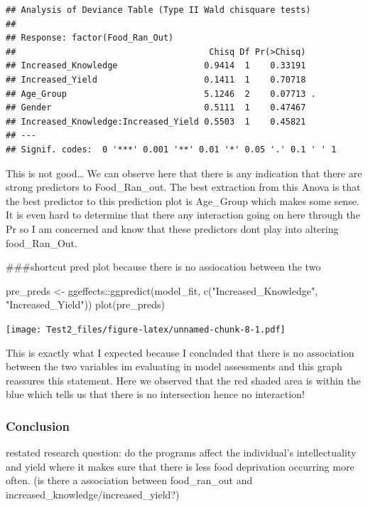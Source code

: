 \documentclass[
]{article}
\newenvironment{Shaded}{\begin{snugshade}}{\end{snugshade}}
\newcommand{\FunctionTok}[1]{\textcolor[rgb]{0.00,0.00,0.00}{#1}}
\newcommand{\NormalTok}[1]{#1}
\newcommand{\OtherTok}[1]{\textcolor[rgb]{0.56,0.35,0.01}{#1}}
\newcommand{\SpecialCharTok}[1]{\textcolor[rgb]{0.00,0.00,0.00}{#1}}
\newcommand{\StringTok}[1]{\textcolor[rgb]{0.31,0.60,0.02}{#1}}
\begin{document}
\begin{verbatim}
## Analysis of Deviance Table (Type II Wald chisquare tests)
## 
## Response: factor(Food_Ran_Out)
##                                      Chisq Df Pr(>Chisq)  
## Increased_Knowledge                 0.9414  1    0.33191  
## Increased_Yield                     0.1411  1    0.70718  
## Age_Group                           5.1246  2    0.07713 .
## Gender                              0.5111  1    0.47467  
## Increased_Knowledge:Increased_Yield 0.5503  1    0.45821  
## ---
## Signif. codes:  0 '***' 0.001 '**' 0.01 '*' 0.05 '.' 0.1 ' ' 1
\end{verbatim}

This is not good\ldots{} We can observe here that there is any
indication that there are strong predictors to Food\_Ran\_out. The best
extraction from this Anova is that the best predictor to this prediction
plot is Age\_Group which makes some sense. It is even hard to determine
that there any interaction going on here through the Pr so I am
concerned and know that these predictors dont play into altering
food\_Ran\_Out.

\#\#\#shortcut pred plot because there is no assiocation between the two

\begin{Shaded}
\begin{Highlighting}[]
\NormalTok{pre\_preds }\OtherTok{\textless{}{-}}\NormalTok{ ggeffects}\SpecialCharTok{::}\FunctionTok{ggpredict}\NormalTok{(model\_fit, }\FunctionTok{c}\NormalTok{(}\StringTok{"Increased\_Knowledge"}\NormalTok{, }\StringTok{"Increased\_Yield"}\NormalTok{))}
\FunctionTok{plot}\NormalTok{(pre\_preds)}
\end{Highlighting}
\end{Shaded}

\texttt{[image: Test2\_files/figure-latex/unnamed-chunk-8-1.pdf]}

This is exactly what I expected because I concluded that there is no
association between the two variables im evaluating in model assessments
and this graph reassures this statement. Here we observed that the red
shaded area is within the blue which tells us that there is no
intersection hence no interaction!

\hypertarget{conclusion}{%
\subsubsection{Conclusion}\label{conclusion}}

restated research question: do the programs affect the individual's
intellectuality and yield where it makes sure that there is less food
deprivation occurring more often. (is there a association between
food\_ran\_out and increased\_knowledge/increased\_yield?)
\end{document}
